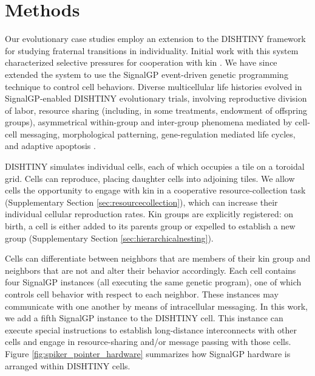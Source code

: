\section{Methods}

Our evolutionary case studies employ an extension to the DISHTINY framework for studying fraternal transitions in individuality.
Initial work with this system characterized selective pressures for cooperation with kin \citep{moreno2019toward}.
We have since extended the system to use the SignalGP event-driven genetic programming technique \citep{lalejini2018evolving} to control cell behaviors.
Diverse multicellular life histories evolved in SignalGP-enabled DISHTINY evolutionary trials, involving reproductive division of labor, resource sharing (including, in some treatments, endowment of offspring groups), asymmetrical within-group and inter-group phenomena mediated by cell-cell messaging, morphological patterning, gene-regulation mediated life cycles, and adaptive apoptosis \citep{dishtinygp}.

DISHTINY simulates individual cells, each of which occupies a tile on a toroidal grid.
Cells can reproduce, placing daughter cells into adjoining tiles.
We allow cells the opportunity to engage with kin in a cooperative resource-collection task (Supplementary Section \ref{sec:resourcecollection}), which can increase their individual cellular reproduction rates.
Kin groups are explicitly registered: on birth, a cell is either added to its parents group or expelled to establish a new group (Supplementary Section \ref{sec:hierarchicalnesting}).

Cells can differentiate between neighbors that are members of their kin group and neighbors that are not and alter their behavior accordingly.
Each cell %
contains four SignalGP instances (all executing the same genetic program), one of which controls cell behavior with respect to each neighbor.
These instances may communicate with one another by means of intracellular messaging.
In this work, we add a fifth SignalGP instance to the DISHTINY cell.
This instance can execute special instructions to establish long-distance interconnects with other cells and engage in resource-sharing and/or message passing with those cells.
Figure \ref{fig:spiker_pointer_hardware} summarizes how SignalGP hardware is arranged within DISHTINY cells.

